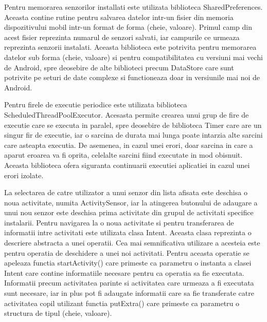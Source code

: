 Pentru memorarea senzorilor installati este utilizata biblioteca SharedPreferences. Aceasta contine rutine pentru salvarea datelor intr-un fisier din memoria 
dispozitivului mobil intr-un format de forma (cheie, valoare). Primul camp din acest fisier reprezinta numarul de senzori salvati, iar campurile ce urmeaza 
reprezinta senzorii instalati. Aceasta biblioteca este potrivita pentru memorarea datelor sub forma (cheie, valoare) si pentru compatibilitatea cu versiuni mai 
vechi de Android, spre deosebire de alte biblioteci precum DataStore care sunt potrivite pe seturi de date complexe si functioneaza doar in versiunile mai noi de 
Android.

Pentru firele de executie periodice este utilizata biblioteca ScheduledThreadPoolExecutor. Acesasta permite crearea unui grup de fire de executie care se executa
in paralel, spre deosebire de biblioteca Timer care are un singur fir de executie, iar o sarcina de durata mai lunga poate intarzia alte sarcini care asteapta 
executia. De asemenea, in cazul unei erori, doar sarcina in care a aparut eroarea va fi oprita, celelalte sarcini fiind executate in mod obisnuit. Aceasta 
biblioteca ofera siguranta continuarii executiei aplicatiei in cazul unei erori izolate.

La selectarea de catre utilizator a unui senzor din lista afisata este deschisa o noua activitate, numita ActivitySensor, iar la atingerea butonului de adaugare a unui 
nou senzor este deschisa prima activitate din grupul de activitati specifice instalarii. Pentru navigarea la o noua activitate si pentru transferarea de informatii intre 
activitati este utilizata clasa Intent. Aceasta clasa reprezinta o descriere abstracta a unei operatii. Cea mai semnificativa utilizare a acesteia este pentru operatia de 
deschidere a unei noi activitati. Pentru aceasta operatie se apeleaza functia startActivity() care primeste ca parametru o instanta a clasei Intent care contine informatiile 
necesare pentru ca operatia sa fie executata. Informatii precum activitatea parinte si activitatea care urmeaza a fi executata sunt necesare, iar in plus pot fi adaugate 
informatii care sa fie transferate catre activitatea copil utilizant functia putExtra() care primeste ca parametru o structura de tipul (cheie, valoare).

